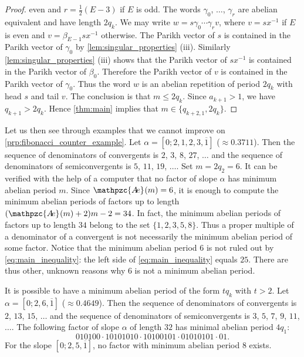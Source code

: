 \documentclass[a4paper,fleqn]{article}
\newcommand{\abexp}[2][]{\mathpzc{A\mkern-3mu e}_{#1}(#2)}
\begin{document}
\begin{proof}
    even and $r = \tfrac12(E - 3)$ if $E$ is odd. The words $\gamma_0$, $\ldots$, $\gamma_r$ are abelian equivalent and
    have length $2q_k$. We may write $w = s\gamma_0 \dotsm \gamma_r v$, where $v = sx^{-1}$ if $E$ is even and
    $v = \beta_{E-1}sx^{-1}$ otherwise. The Parikh vector of $s$ is contained in the Parikh vector of $\gamma_0$ by
    \autoref{lem:singular_properties} (iii). Similarly \autoref{lem:singular_properties} (iii) shows that the Parikh
    vector of $sx^{-1}$ is contained in the Parikh vector of $\beta_0$. Therefore the Parikh vector of $v$ is contained
    in the Parikh vector of $\gamma_0$. Thus the word $w$ is an abelian repetition of period $2q_k$ with head $s$ and
    tail $v$. The conclusion is that $m \leq 2q_k$. Since $a_{k+1} > 1$, we have $q_{k+1} > 2q_k$. Hence
    \autoref{thm:main} implies that $m \in \{q_{k+2,1}, 2q_k\}$.
  \end{proof}

  Let us then see through examples that we cannot improve on \autoref{prp:fibonacci_counter_example}. Let
  $\alpha = [0; 2, 1, 2, 3, \overline{1}]$ ($\approx 0.3711$). Then the sequence of denominators of convergents is $2$,
  $3$, $8$, $27$, $\ldots$ and the sequence of denominators of semiconvergents is $5$, $11$, $19$, $\ldots$. Set
  $m = 2q_2 = 6$. It can be verified with the help of a computer that no factor of slope $\alpha$ has minimum abelian
  period $m$. Since $\abexp{m} = 6$, it is enough to compute the minimum abelian periods of factors up to length
  $(\abexp{m} + 2)m - 2 = 34$. In fact, the minimum abelian periods of factors up to length $34$ belong to the set
  $\{1, 2, 3, 5, 8\}$. Thus a proper multiple of a denominator of a convergent is not necessarily the minimum abelian
  period of some factor. Notice that the minimum abelian period $6$ is not ruled out by \eqref{eq:main_inequality}: the
  left side of \eqref{eq:main_inequality} equals $25$. There are thus other, unknown reasons why $6$ is not a minimum
  abelian period.

  It is possible to have a minimum abelian period of the form $tq_k$ with $t > 2$. Let
  $\alpha = [0; 2, 6, \overline{1}]$ ($\approx 0.4649$). Then the sequence of denominators of convergents is $2$, $13$,
  $15$, $\ldots$ and the sequence of denominators of semiconvergents is $3$, $5$, $7$, $9$, $11$, $\ldots$. The
  following factor of slope $\alpha$ of length $32$ has minimal abelian period $4q_1$:
  \begin{equation*}
    010100 \cdot 10101010 \cdot 10100101 \cdot 01010101 \cdot 01.
  \end{equation*}
  For the slope $[0; 2, 5, \overline{1}]$, no factor with minimum abelian period $8$ exists.
\end{document}
